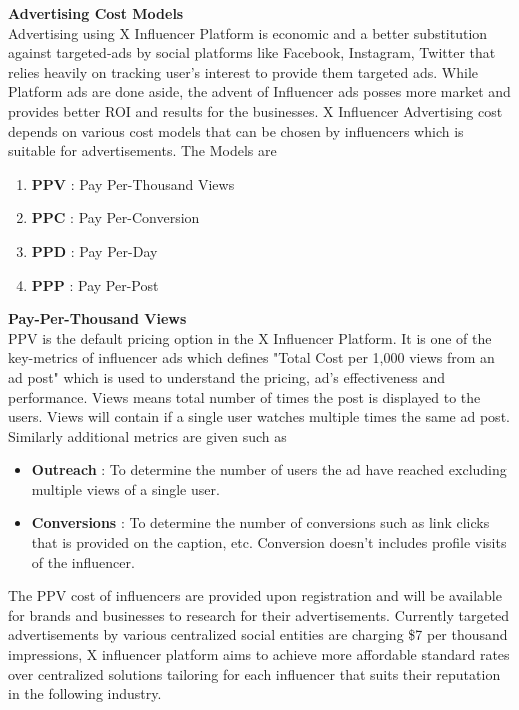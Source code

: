 \documentclass[letterpaper,11pt]{article}
\begin{document}
\textbf{Advertising Cost Models}\\

Advertising using X Influencer Platform is economic and a better substitution against targeted-ads by social platforms like Facebook, Instagram, Twitter that relies heavily on tracking user's interest to provide them targeted ads. While Platform ads are done aside, the advent of Influencer ads posses more market and provides better ROI and results for the businesses. X Influencer Advertising cost depends on various cost models that can be chosen by influencers which is suitable for advertisements. The Models are
\begin{enumerate}[wide, labelwidth=!, labelindent=0pt]
\item \textbf{PPV} : Pay Per-Thousand Views
\item \textbf{PPC} : Pay Per-Conversion
\item \textbf{PPD} : Pay Per-Day
\item \textbf{PPP} : Pay Per-Post
\end{enumerate}


\textbf{Pay-Per-Thousand Views}\\

PPV is the default pricing option in the X Influencer Platform. It is one of the key-metrics of influencer ads which defines "Total Cost per 1,000 views from an ad post" which is used to understand the pricing, ad's effectiveness and performance. Views means total number of times the post is displayed to the users. Views will contain if a single user watches multiple times the same ad post. Similarly additional metrics are given such as
\begin{itemize}[wide, labelwidth=!, labelindent=0pt]
\item \textbf{Outreach} : To determine the number of users the ad have reached excluding multiple views of a single user.
\item \textbf{Conversions} : To determine the number of conversions such as link clicks that is provided on the caption, etc. Conversion doesn't includes profile visits of the influencer.
\end{itemize}

The PPV cost of influencers are provided upon registration and will be available for brands and businesses to research for their advertisements. Currently targeted advertisements by various centralized social entities are charging \$7 per thousand impressions, X influencer platform aims to achieve more affordable standard rates over centralized solutions tailoring for each influencer that suits their reputation in the following industry.\\
\end{document}
